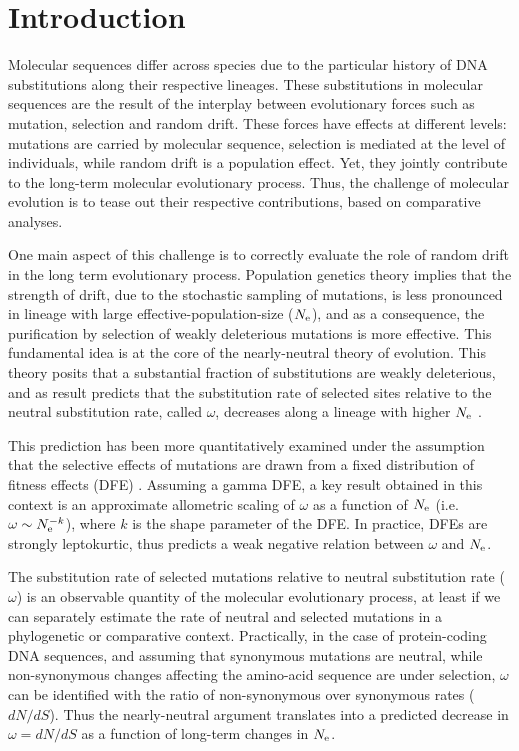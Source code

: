 \section{Introduction}
Molecular sequences differ across species due to the particular history of \acrshort{DNA} \glspl{substitution} along their respective lineages.
These \glspl{substitution} in molecular sequences are the result of the interplay between evolutionary forces such as mutation, selection and random \gls{drift}.
These forces have effects at different levels: mutations are carried by molecular sequence, selection is mediated at the level of individuals, while random \gls{drift} is a population effect.
Yet, they jointly contribute to the long-term molecular evolutionary process.
Thus, the challenge of molecular evolution is to tease out their respective contributions, based on comparative analyses.

One main aspect of this challenge is to correctly evaluate the role of random drift in the long term evolutionary process.
Population genetics theory implies that the strength of drift, due to the stochastic sampling of mutations, is less pronounced in lineage with large \gls{effective-population-size} ($N_{\mathrm{e}}$), and as a consequence, the purification by selection of weakly deleterious mutations is more effective.
This fundamental idea is at the core of the \gls{nearly-neutral} theory of evolution.
This theory posits that a substantial fraction of \glspl{substitution} are weakly deleterious, and as result predicts that the \gls{substitution} rate of selected sites relative to the \gls{neutral} \gls{substitution} rate, called $\omega$, decreases along a lineage with higher $N_{\mathrm{e}}$ \citep{Ohta1972, Ohta1992}.

This prediction has been more quantitatively examined under the assumption that the selective effects of mutations are drawn from a fixed distribution of fitness effects (\acrshort{DFE}) \citep{Kimura1979, Welch2008}.
Assuming a gamma \acrshort{DFE}, a key result obtained in this context is an approximate allometric scaling of $\omega$ as a function of $N_{\mathrm{e}}$ (i.e. $\omega \sim N_{\mathrm{e}}^{-k}$), where $k$ is the shape parameter of the \acrshort{DFE}.
In practice, DFEs are strongly leptokurtic, thus predicts a weak negative relation between $\omega$ and $N_{\mathrm{e}}$.

The \gls{substitution} rate of selected mutations relative to \gls{neutral} \gls{substitution} rate ($\omega$) is an observable quantity of the molecular evolutionary process, at least if we can separately estimate the rate of \gls{neutral} and selected mutations in a phylogenetic or comparative context.
Practically, in the case of protein-coding \acrshort{DNA} sequences, and assuming that synonymous mutations are \gls{neutral}, while non-synonymous changes affecting the amino-acid sequence are under selection, $\omega$ can be identified with the ratio of non-synonymous over \gls{synonymous} rates ($dN/dS$).
Thus the \gls{nearly-neutral} argument translates into a predicted decrease in $\omega = dN/dS$ as a function of long-term changes in $N_{\mathrm{e}}$.

